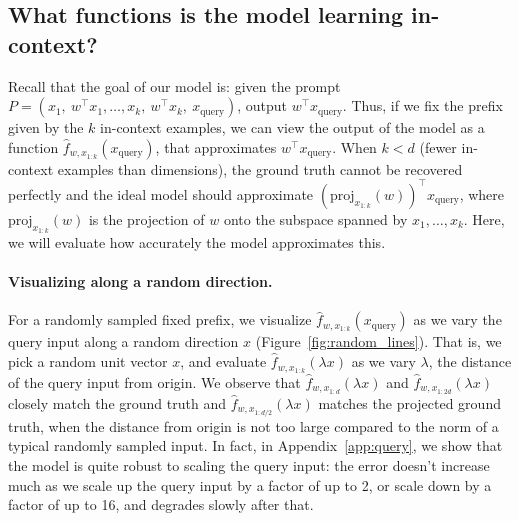 \documentclass{article}
\begin{document}
\subsection{What functions is the model learning in-context?}
Recall that the goal of our model is: given the prompt $P=(x_1,\ w^\top x_1, \ldots, x_k,\ w^\top x_k,\ x_{\text{query}})$, output $w^\top x_\text{query}$.
Thus, if we fix the prefix given by the $k$ in-context examples, we can view the output of the model  as a function  $\hat{f}_{w,  x_{1:k}}(x_{\text{query}})$, that approximates $w^\top x_{\text{query}}$.
When $k < d$ (fewer in-context examples than dimensions), the ground truth cannot be recovered perfectly  and the ideal model should approximate $(\text{proj}_{x_{1:k}}(w))^\top x_{\text{query}}$, where $\text{proj}_{x_{1:k}}(w)$ is the projection of $w$ onto the subspace spanned by $x_1,\ldots,x_k$. Here, we will evaluate how accurately the model approximates this.

\paragraph{Visualizing along a random direction.}
For a randomly sampled fixed prefix, we visualize $\hat{f}_{w,  x_{1:k}}(x_{\text{query}})$  as we vary the query input along a random direction $x$ (Figure~\ref{fig:random_lines}).
That is, we pick a random unit vector $x$, and evaluate $\hat{f}_{w,  x_{1:k}}(\lambda x)$ as we vary  $\lambda$, the distance of the query input from origin. 
We observe that  $\hat{f}_{w,  x_{1:d}}(\lambda x)$ and $\hat{f}_{w,  x_{1:2d}}(\lambda x)$ closely match the ground truth  and $\hat{f}_{w,  x_{1:d/2}}(\lambda x)$ matches the projected ground truth, when the distance from origin is not too large compared to the norm of a typical randomly sampled input. In fact, in Appendix~\ref{app:query}, we show that the model is quite robust to scaling the query input:  the error doesn't increase much as we scale up the query input by a factor of up to 2, or scale down by a factor of up to 16, and degrades slowly after that.
\end{document}
